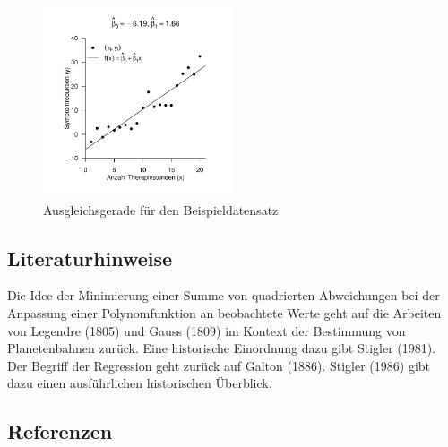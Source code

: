 \documentclass[
  letterpaper,
  DIV=11]{scrartcl}
\theoremstyle{plain}
\theoremstyle{definition}
\theoremstyle{remark}
\begin{document}
\begin{figure}

{\centering \includegraphics[width=0.5\textwidth,height=\textheight]{./Abbildungen/reg_ausgleichsgerade.pdf}

}

\caption{\label{fig-ausgleichsgerade}Ausgleichsgerade für den
Beispieldatensatz}

\end{figure}

\hypertarget{literaturhinweise}{%
\subsection{Literaturhinweise}\label{literaturhinweise}}

Die Idee der Minimierung einer Summe von quadrierten Abweichungen bei
der Anpassung einer Polynomfunktion an beobachtete Werte geht auf die
Arbeiten von Legendre (1805) und Gauss (1809) im Kontext der Bestimmung
von Planetenbahnen zurück. Eine historische Einordnung dazu gibt Stigler
(1981). Der Begriff der Regression geht zurück auf Galton (1886).
Stigler (1986) gibt dazu einen ausführlichen historischen Überblick.

\hypertarget{referenzen}{%
\subsection*{Referenzen}\label{referenzen}}
\end{document}
